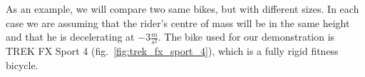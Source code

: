 \documentclass[12pt, a4]{article}
\begin{document}
As an example, we will compare two same bikes, but with different sizes. In each case we are assuming that the 
rider's centre of mass will be in the same height and that he is decelerating at $-3\frac{m}{s^2}$. The bike used 
for our demonstration is TREK FX Sport 4 (fig.~\ref{fig:trek_fx_sport_4}), which is a fully rigid fitness bicycle.
\end{document}
